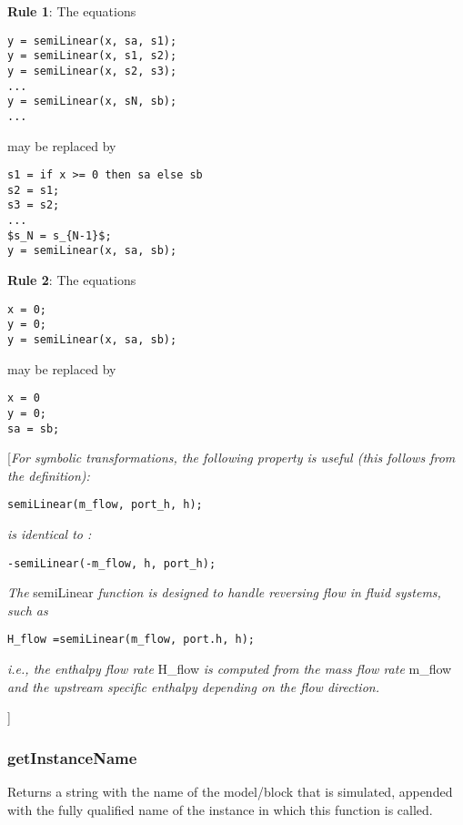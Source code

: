 \textbf{Rule 1}: The equations

\begin{lstlisting}[language=modelica]
y = semiLinear(x, sa, s1);
y = semiLinear(x, s1, s2);
y = semiLinear(x, s2, s3);
...
y = semiLinear(x, sN, sb);
...
\end{lstlisting}

may be replaced by
\begin{lstlisting}[language=modelica, mathescape=true]
s1 = if x >= 0 then sa else sb
s2 = s1;
s3 = s2;
...
$s_N = s_{N-1}$;
y = semiLinear(x, sa, sb);
\end{lstlisting}

\textbf{Rule 2}: The equations
\begin{lstlisting}[language=modelica]
x = 0;
y = 0;
y = semiLinear(x, sa, sb);
\end{lstlisting}

may be replaced by
\begin{lstlisting}[language=modelica]
x = 0
y = 0;
sa = sb;
\end{lstlisting}

{[}\emph{For symbolic transformations, the following property is useful
(this follows from the definition):}
\begin{lstlisting}[language=modelica]
semiLinear(m_flow, port_h, h);
\end{lstlisting}
\emph{is identical to :}
\begin{lstlisting}[language=modelica]
-semiLinear(-m_flow, h, port_h);
\end{lstlisting}

\emph{The} semiLinear \emph{function is designed to handle reversing
flow in fluid systems, such as}
\begin{lstlisting}[language=modelica]
H_flow =semiLinear(m_flow, port.h, h);
\end{lstlisting}

\emph{i.e., the enthalpy flow rate} H\_flow \emph{is computed from the
mass flow rate} m\_flow \emph{and the upstream specific enthalpy
depending on the flow direction. }

{]}

\subsubsection{getInstanceName}

Returns a string with the name of the model/block that is simulated,
appended with the fully qualified name of the instance in which this
function is called.

